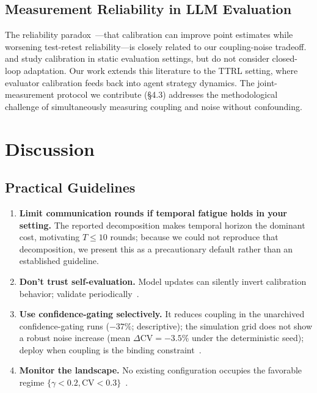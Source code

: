 \documentclass[11pt]{article}
\newcommand{\CV}{\ensuremath{\mathrm{CV}}}
\theoremstyle{definition}
\theoremstyle{remark}
\begin{document}
\subsection{Measurement Reliability in LLM Evaluation}

The reliability paradox~\citep{messing2026tee}---that calibration can improve point estimates while worsening test-retest reliability---is closely related to our coupling-noise tradeoff. \citet{guo2017calibration} and \citet{tian2023just} study calibration in static evaluation settings, but do not consider closed-loop adaptation. Our work extends this literature to the TTRL setting, where evaluator calibration feeds back into agent strategy dynamics. The joint-measurement protocol we contribute (\S4.3) addresses the methodological challenge of simultaneously measuring coupling and noise without confounding.

\section{Discussion}

\subsection{Practical Guidelines}

\begin{enumerate}[leftmargin=*,nosep]
    \item \textbf{Limit communication rounds if temporal fatigue holds in your setting.} The reported decomposition makes temporal horizon the dominant cost, motivating $T \leq 10$ rounds; because we could not reproduce that decomposition, we present this as a precautionary default rather than an established guideline.
    \item \textbf{Don't trust self-evaluation.} Model updates can silently invert calibration behavior; validate periodically~\citep{zhou2024incontext}.
    \item \textbf{Use confidence-gating selectively.} It reduces coupling in the unarchived confidence-gating runs ($-37\%$; descriptive); the simulation grid does not show a robust noise increase (mean $\Delta\CV = -3.5\%$ under the deterministic seed); deploy when coupling is the binding constraint~\citep{chen2025unicr}.
    \item \textbf{Monitor the landscape.} No existing configuration occupies the favorable regime $\{\gamma < 0.2, \CV < 0.3\}$~\citep{caleffects2026}.
\end{enumerate}
\end{document}
